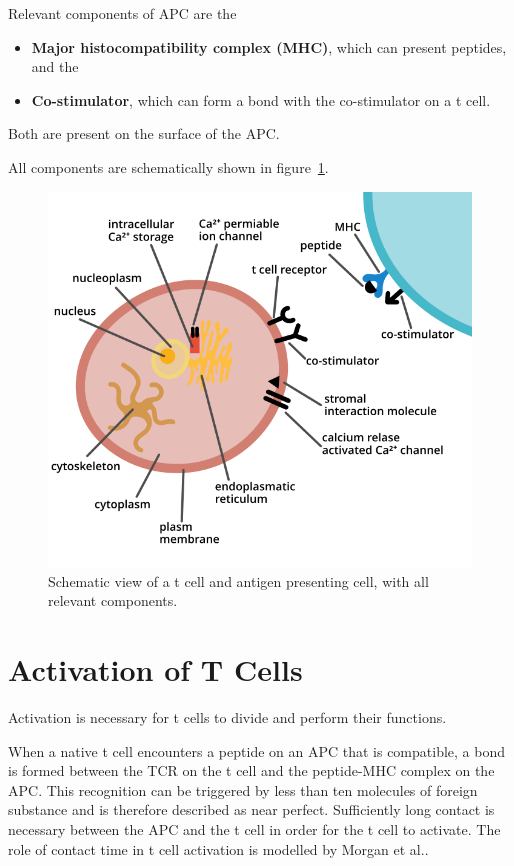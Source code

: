 Relevant components of APC are the
\begin{itemize}
	\item \textbf{Major histocompatibility complex (MHC)}, which can present peptides, and the
	\item \textbf{Co-stimulator}, which can form a bond with the co-stimulator on a t cell.
\end{itemize}

Both are present on the surface of the APC.

All components are schematically shown in figure~\ref{fig:tcellcomponents}.

\begin{figure}[h]
	\centering
	\includegraphics[width=\linewidth]{fig/t_cell_components}
	\caption{Schematic view of a t cell and antigen presenting cell, with all relevant components.}
	\label{fig:tcellcomponents}
\end{figure}

\newpage
\section{Activation of T Cells}
\label{sec:t-cell/activation}

Activation is necessary for t cells to divide and perform their functions.\cite{Ganong1997}

When a native t cell encounters a peptide on an APC that is compatible, a bond is formed between the TCR on the t cell and the peptide-MHC complex on the APC. This recognition can be triggered by less than ten molecules of foreign substance and is therefore described as near perfect. Sufficiently long contact is necessary between the APC and the t cell in order for the t cell to activate. The role of contact time in t cell activation is modelled by Morgan et al.\cite{morgan2023}.

